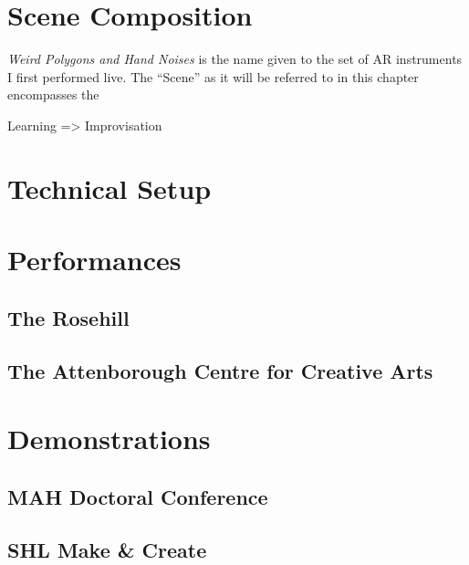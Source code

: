 \section{Scene Composition} \label{sec: performance-composition}
\textit{Weird Polygons and Hand Noises} is the name given to the set of AR instruments I first performed live. The ``Scene'' as it will be referred to in this chapter encompasses the 

Learning => Improvisation


\section{Technical Setup} \label{sec: performance-setup}




\section{Performances} \label{sec: performance-performances}
\subsection{The Rosehill} \label{sec: performance-performances-rosehill}
\subsection{The Attenborough Centre for Creative Arts} \label{sec: performance-performances-acca}



\section{Demonstrations} \label{sec: performance-demonstrations}
\subsection{MAH Doctoral Conference} \label{sec: performance-demonstrations-mah}
\subsection{SHL Make \& Create} \label{sec: performance-demonstrations-shl}